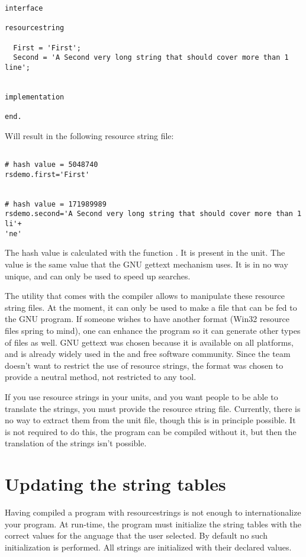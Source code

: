 {\begin{verbatim}
interface

resourcestring

  First = 'First';
  Second = 'A Second very long string that should cover more than 1 line';


implementation

end.
\end{verbatim}
Will result in the following resource string file:
\begin{verbatim}

# hash value = 5048740
rsdemo.first='First'


# hash value = 171989989
rsdemo.second='A Second very long string that should cover more than 1 li'+
'ne'

\end{verbatim}
The hash value is calculated with the function . It is present in
the  unit. The value is the same value that the GNU gettext
mechanism uses. It is in no way unique, and can only be used to speed up
searches.

The  utility that comes with the \fpc compiler allows to
manipulate these resource string files. At the moment, it can only be used
to make a  file that can be fed to the GNU  program.
If someone wishes to have another format (Win32 resource files spring to
mind), one can enhance the  program so it can generate
other types of files as well. GNU gettext was chosen because it is available
on all platforms, and is already widely used in the  and free
software community. Since the \fpc team doesn't want to restrict the use
of resource strings, the  format was chosen to provide a neutral
method, not restricted to any tool.

If you use resource strings in your units, and you want people to be able to
translate the strings, you must provide the resource string file. Currently,
there is no way to extract them from the unit file, though this is in
principle possible. It is not required to do this, the program can be
compiled without it, but then the translation of the strings isn't possible.

\section{Updating the string tables}
Having compiled a program with resourcestrings is not enough to
internationalize your program. At run-time, the program must initialize
the string tables with the correct values for the anguage that the user
selected. By default no such initialization is performed. All strings
are initialized with their declared values.

}
